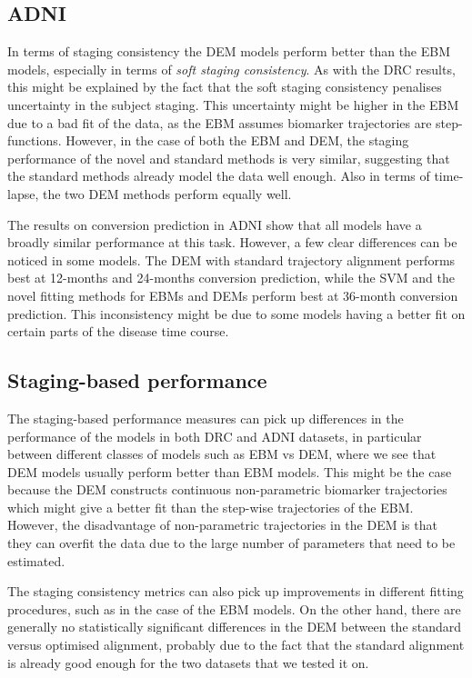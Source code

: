 \subsection{ADNI}
\label{sec:perfADNIdiscussion}


In terms of staging consistency the DEM models perform better than the EBM models, especially in terms of \emph{soft staging consistency}. As with the DRC results, this might be explained by the fact that the soft staging consistency penalises uncertainty in the subject staging. This uncertainty might be higher in the EBM due to a bad fit of the data, as the EBM assumes biomarker trajectories are step-functions. However, in the case of both the EBM and DEM, the staging performance of the novel and standard methods is very similar, suggesting that the standard methods already model the data well enough. Also in terms of time-lapse, the two DEM methods perform equally well.

The results on conversion prediction in ADNI show that all models have a broadly similar performance at this task. However, a few clear differences can be noticed in some models. The DEM with standard trajectory alignment performs best at 12-months and 24-months conversion prediction, while the SVM and the novel fitting methods for EBMs and DEMs perform best at 36-month conversion prediction. This inconsistency might be due to some models having a better fit on certain parts of the disease time course.


\subsection{Staging-based performance}

The staging-based performance measures can pick up differences in the performance of the models in both DRC and ADNI datasets, in particular between different classes of models such as EBM vs DEM, where we see that DEM models usually perform better than EBM models. This might be the case because the DEM constructs continuous non-parametric biomarker trajectories which might give a better fit than the step-wise trajectories of the EBM. However, the disadvantage of non-parametric trajectories in the DEM is that they can overfit the data due to the large number of parameters that need to be estimated. 

The staging consistency metrics can also pick up improvements in different fitting procedures, such as in the case of the EBM models. On the other hand, there are generally no statistically significant differences in the DEM between the standard versus optimised alignment, probably due to the fact that the standard alignment is already good enough for the two datasets that we tested it on.

